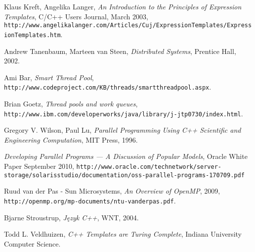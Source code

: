 \begin{thebibliography}{99}
 Klaus Kreft, Angelika Langer, \textit{An Introduction to the Principles of Expression Templates}, C/C++ Users Journal, March 2003, \texttt{http://www.angelikalanger.com/Articles/Cuj/ExpressionTemplates/ExpressionTemplates.htm}.

 Andrew Tanenbaum, Marteen van Steen, \textit{Distributed Systems}, Prentice Hall, 2002.

 Ami Bar, \textit{Smart Thread Pool}, \texttt{http://www.codeproject.com/KB/threads/smartthreadpool.aspx}.

 Brian Goetz, \textit{Thread pools and work queues}, \texttt{http://www.ibm.com/developerworks/java/library/j-jtp0730/index.html}.

 Gregory V. Wilson, Paul Lu, \textit{Parallel Programming Using C++ Scientific and Engineering Computation}, MIT Press, 1996.

 \textit{Developing Parallel Programs — A Discussion of Popular Models}, Oracle White Paper September 2010, \texttt{http://www.oracle.com/technetwork/server-storage/solarisstudio/documentation/oss-parallel-programs-170709.pdf}

 Ruud van der Pas - Sun Microsystems, \textit{An Overview of OpenMP}, 2009, \texttt{http://openmp.org/mp-documents/ntu-vanderpas.pdf}.

 Bjarne Stroustrup, \textit{Język C++}, WNT, 2004.

 Todd L. Veldhuizen, \textit{C++ Templates are Turing Complete}, Indiana University Computer Science.

\end{thebibliography}